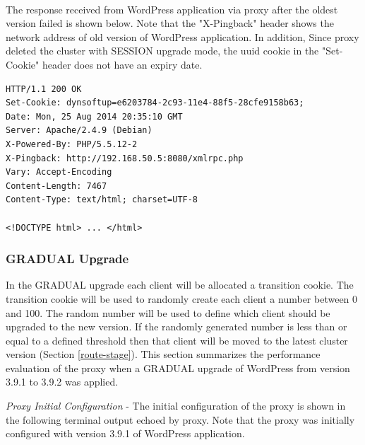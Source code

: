 \documentclass[a4paper,11pt,twoside]{report}
\begin{document}
\noindent\\
The response received from WordPress application via proxy after the oldest version failed is shown below. Note that the "X-Pingback" header shows the network address of old version of WordPress application. In addition, Since proxy deleted the cluster with SESSION upgrade mode, the uuid cookie in the "Set-Cookie" header does not have an expiry date.\smallskip 

\begin{lstlisting}[language=terminal]
HTTP/1.1 200 OK
Set-Cookie: dynsoftup=e6203784-2c93-11e4-88f5-28cfe9158b63;
Date: Mon, 25 Aug 2014 20:35:10 GMT
Server: Apache/2.4.9 (Debian)
X-Powered-By: PHP/5.5.12-2
X-Pingback: http://192.168.50.5:8080/xmlrpc.php
Vary: Accept-Encoding
Content-Length: 7467
Content-Type: text/html; charset=UTF-8

<!DOCTYPE html> ... </html>
\end{lstlisting}

\subsubsection*{GRADUAL Upgrade}
In the GRADUAL upgrade each client will be allocated a transition cookie. The transition cookie will be used to randomly create each client a number between 0 and 100. The random number will be used to define which client should be upgraded to the new version. If the randomly generated number is less than or equal to a defined threshold then that client will be moved to the latest cluster version (Section \ref{route-stage}). This section summarizes the performance evaluation of the proxy when a GRADUAL upgrade of WordPress from version 3.9.1 to 3.9.2 was applied. \medskip

\noindent
\textit{Proxy Initial Configuration} - The initial configuration of the proxy is shown in the following terminal output echoed by proxy. Note that the proxy was initially configured with version 3.9.1 of WordPress application.\smallskip
\end{document}
